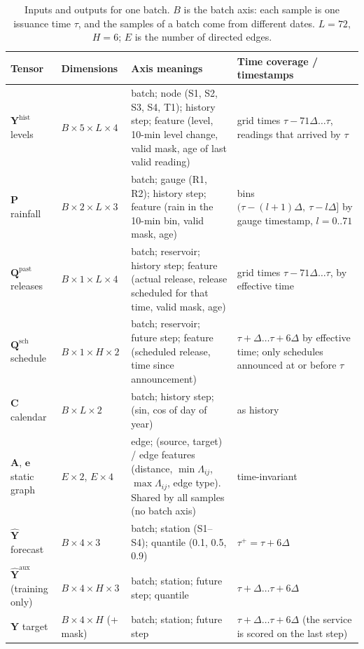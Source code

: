 \begin{table}[H]
\centering\small
\caption{Inputs and outputs for one batch. $B$ is the batch axis: each sample is one issuance
time $\tau$, and the samples of a batch come from different dates. $L=72$, $H=6$; $E$ is the
number of directed edges.}
\label{tab:data}
\begin{tabularx}{\textwidth}{@{}p{2.6cm}p{2.5cm}Xp{3.6cm}@{}}
\toprule
Tensor & Dimensions & Axis meanings & Time coverage / timestamps\\
\midrule
$\mathbf{Y}^{\mathrm{hist}}$ levels & $B\times5\times L\times4$ & batch; node (S1, S2, S3, S4, T1);
history step; feature (level, 10-min level change, valid mask, age of last valid reading) &
grid times $\tau-71\Delta\ldots\tau$, readings that arrived by $\tau$\\
$\mathbf{P}$ rainfall & $B\times2\times L\times3$ & batch; gauge (R1, R2); history step; feature
(rain in the 10-min bin, valid mask, age) & bins $(\tau-(l{+}1)\Delta,\ \tau-l\Delta]$ by gauge
timestamp, $l=0..71$\\
$\mathbf{Q}^{\mathrm{past}}$ releases & $B\times1\times L\times4$ & batch; reservoir; history step;
feature (actual release, release scheduled for that time, valid mask, age) & grid times
$\tau-71\Delta\ldots\tau$, by effective time\\
$\mathbf{Q}^{\mathrm{sch}}$ schedule & $B\times1\times H\times2$ & batch; reservoir; future step;
feature (scheduled release, time since announcement) & $\tau+\Delta\ldots\tau+6\Delta$ by effective
time; only schedules announced at or before $\tau$\\
$\mathbf{C}$ calendar & $B\times L\times2$ & batch; history step; (sin, cos of day of year) & as history\\
$\mathbf{A}$, $\mathbf{e}$ static graph & $E\times2$, $E\times4$ & edge; (source, target) / edge features
(distance, $\min\Lambda_{ij}$, $\max\Lambda_{ij}$, edge type). Shared by all samples (no batch axis) &
time-invariant\\
\midrule
$\hat{\mathbf{Y}}$ forecast & $B\times4\times3$ & batch; station (S1--S4); quantile (0.1, 0.5, 0.9)
& $\tau^{+}=\tau+6\Delta$\\
$\hat{\mathbf{Y}}^{\mathrm{aux}}$ (training only) & $B\times4\times H\times3$ & batch; station; future
step; quantile & $\tau+\Delta\ldots\tau+6\Delta$\\
$\mathbf{Y}$ target & $B\times4\times H$ (+ mask) & batch; station; future step & $\tau+\Delta\ldots
\tau+6\Delta$ (the service is scored on the last step)\\
\bottomrule
\end{tabularx}
\end{table}

